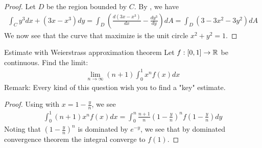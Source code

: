 \documentclass{report}
\begin{document}
\begin{proof}
Let $D$ be the region bounded by  $C$. By , we have 
\begin{align*}
\int_C y^3dx+ (3x-x^3)dy= \int_D \left(\frac{d(3x-x^3)}{dx} - \frac{dy^3}{dy} \right) dA= \int_D \left( 3-3x^2-3y^2 \right) dA
\end{align*}
We now see that the curve that maximize  is the unit circle $x^2+y^2=1$. 
\end{proof}
\begin{question}{Estimate with Weierstrass approximation theorem}{}
Let $f:[0,1]\rightarrow \mathbb{R}$ be continuous. Find the limit: 
\begin{align*}
\lim_{n\to \infty}(n+1)\int_0^1 x^nf(x)dx
\end{align*}
Remark: Every kind of this question wish you to find a "key" estimate. 
\end{question}
\begin{proof}
Using  with $x= 1-\frac{y}{n}$, we see 
\begin{align*}
\int_0^1 (n+1)x^nf(x)dx = \int_0^n \frac{n+1}{n} \left(1-\frac{y}{n}\right)^n f\left(1-\frac{y}{n}\right) dy  
\end{align*}
Noting that $(1-\frac{y}{n})^n$ is dominated by $e^{-y}$, we see that by dominated convergence theorem the integral converge to $f(1)$. 
\end{proof}
\end{document}
